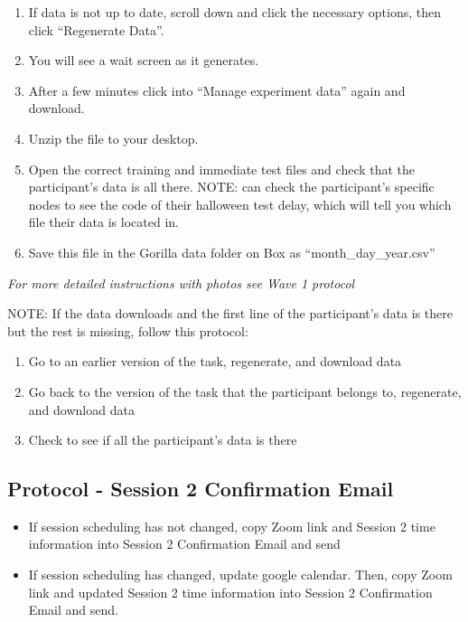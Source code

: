 \documentclass[]{book}
\begin{document}
\begin{enumerate}
\def\labelenumi{\arabic{enumi}.}
\setcounter{enumi}{2}
\item
  If data is not up to date, scroll down and click the necessary options, then click ``Regenerate Data''.
\item
  You will see a wait screen as it generates.
\item
  After a few minutes click into ``Manage experiment data'' again and download.
\item
  Unzip the file to your desktop.
\item
  Open the correct training and immediate test files and check that the participant's data is all there. NOTE: can check the participant's specific nodes to see the code of their halloween test delay, which will tell you which file their data is located in.
\item
  Save this file in the Gorilla data folder on Box as ``month\_day\_year.csv''
\end{enumerate}

\emph{For more detailed instructions with photos see Wave 1 protocol}

NOTE: If the data downloads and the first line of the participant's data is there but the rest is missing, follow this protocol:

\begin{enumerate}
\def\labelenumi{\arabic{enumi}.}
\item
  Go to an earlier version of the task, regenerate, and download data
\item
  Go back to the version of the task that the participant belongs to, regenerate, and download data
\item
  Check to see if all the participant's data is there
\end{enumerate}

\hypertarget{protocol---session-2-confirmation-email-2}{%
\subsection{Protocol - Session 2 Confirmation Email}\label{protocol---session-2-confirmation-email-2}}

\begin{itemize}
\item
  If session scheduling has not changed, copy Zoom link and Session 2 time information into Session 2 Confirmation Email and send
\item
  If session scheduling has changed, update google calendar. Then, copy Zoom link and updated Session 2 time information into Session 2 Confirmation Email and send.
\end{itemize}
\end{document}
